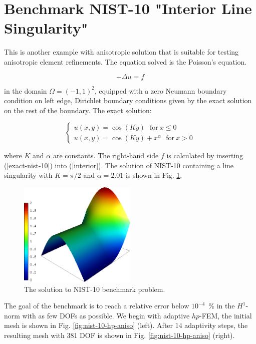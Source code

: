 \section{Benchmark NIST-10 "Interior Line Singularity"}
\label{sec:bench-10}

This is another example with anisotropic solution that is suitable for testing
anisotropic element refinements. The equation solved is the Poisson's equation.

\begin{equation} \label{interior}
-\Delta u = f 
\end{equation}

in the domain $\Omega = (-1, 1)^2$, equipped with a zero
Neumann boundary condition on left edge, Dirichlet boundary
conditions given by the exact solution on the rest of the boundary.
The exact solution:

\begin{equation}\label{exact-nist-10}
\left\{
\begin{array}{l}
\displaystyle
u(x,y) = \cos(Ky)\ \ \ \mbox{for}\ x \le 0 \\
u(x,y) = \cos(Ky) + x^{\alpha}\ \ \ \mbox{for}\ x > 0 
\end{array}
\right.
\end{equation}

where $K$ and $\alpha$ are constants.
The right-hand side $f$ is calculated by inserting
(\ref{exact-nist-10}) into (\ref{interior}).
The solution of NIST-10 containing a line singularity with $K = \pi/2$ and
$\alpha = 2.01$ is shown in Fig. \ref{fig:sln-nist10}.

\begin{figure}[!ht]
\centering
\includegraphics[height=5cm]{nist/nist-10/solution.png}
\caption{The solution to NIST-10 benchmark problem.}
\label{fig:sln-nist10}
\end{figure}

The goal of the benchmark is to reach a relative error below
$10^{-4}$~\% in the $H^1$-norm with as few DOFs as possible.
We begin with adaptive $hp$-FEM,
the initial mesh is shown in Fig. \ref{fig:nist-10-hp-aniso} (left).
After 14 adaptivity steps, the resulting mesh with 381 DOF is shown
in Fig. \ref{fig:nist-10-hp-aniso} (right).

